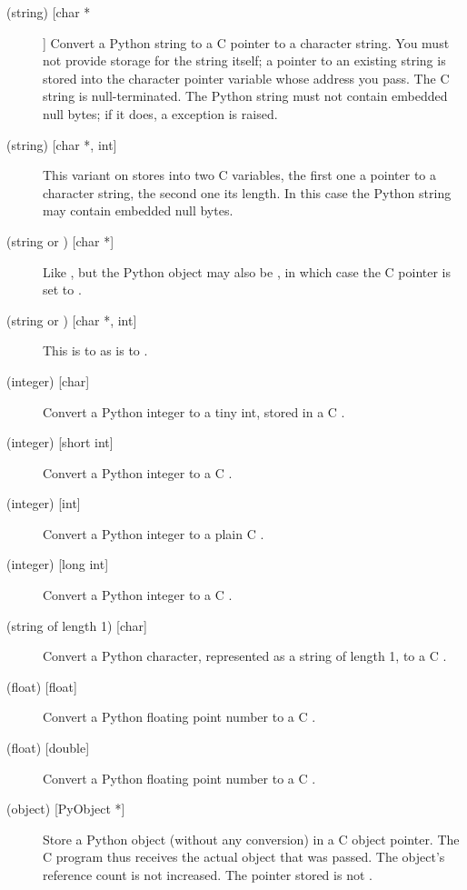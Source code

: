 \begin{description}

\item[ (string) [char *]]
Convert a Python string to a C pointer to a character string.  You
must not provide storage for the string itself; a pointer to an
existing string is stored into the character pointer variable whose
address you pass.  The C string is null-terminated.  The Python string
must not contain embedded null bytes; if it does, a 
exception is raised.

\item[ (string) {[char *, int]}]
This variant on  stores into two C variables, the first one
a pointer to a character string, the second one its length.  In this
case the Python string may contain embedded null bytes.

\item[ (string or ) {[char *]}]
Like , but the Python object may also be , in which
case the C pointer is set to .

\item[ (string or ) {[char *, int]}]
This is to  as  is to .

\item[ (integer) {[char]}]
Convert a Python integer to a tiny int, stored in a C .

\item[ (integer) {[short int]}]
Convert a Python integer to a C .

\item[ (integer) {[int]}]
Convert a Python integer to a plain C .

\item[ (integer) {[long int]}]
Convert a Python integer to a C .

\item[ (string of length 1) {[char]}]
Convert a Python character, represented as a string of length 1, to a
C .

\item[ (float) {[float]}]
Convert a Python floating point number to a C .

\item[ (float) {[double]}]
Convert a Python floating point number to a C .

\item[ (object) {[PyObject *]}]
Store a Python object (without any conversion) in a C object pointer.
The C program thus receives the actual object that was passed.  The
object's reference count is not increased.  The pointer stored is not
.


\end{description}
